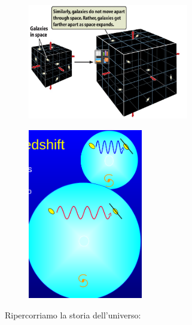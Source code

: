 \begin{minipage}{0.6\textwidth}
    \begin{figure}[H]
        \includegraphics[width=7cm]{immagini16dic/cubonero.png}
    \end{figure}
\end{minipage}
\begin{minipage}{0.4\textwidth}
    \begin{figure}[H]
        \includegraphics[width=5cm]{immagini16dic/waveshift.png}
    \end{figure}
\end{minipage}

Ripercorriamo la storia dell'universo:

